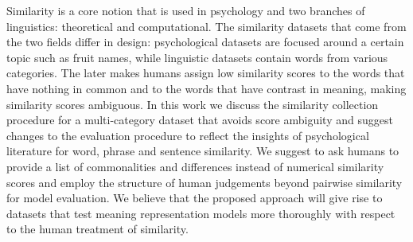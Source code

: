 Similarity is a core notion that is used in psychology and two branches of linguistics: theoretical and computational. The similarity datasets that come from the two fields differ in design: psychological datasets are focused around a certain topic such as fruit names, while linguistic datasets contain words from various categories. The later makes humans assign low similarity scores to the words that have nothing in common and to the words that have contrast in meaning, making similarity scores ambiguous. In this work we discuss the similarity collection procedure for a multi-category dataset that avoids score ambiguity and suggest changes to the evaluation procedure to reflect the insights of psychological literature for word, phrase and sentence similarity. We suggest to ask humans to provide a list of commonalities and differences instead of numerical similarity scores and employ the structure of human judgements beyond pairwise similarity for model evaluation. We believe that the proposed approach will give rise to datasets that test meaning representation models more thoroughly with respect to the human treatment of similarity.
